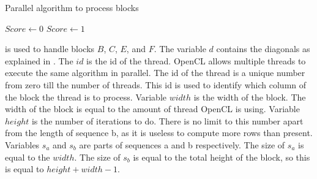 \begin{algorithm}[htb]
\caption{Parallel algorithm to process blocks} \label{block}
\begin{algorithmic}[1]
    \Statex
    \Statex
        \Statex
            \State $Score \gets 0$
        \Else
            \State $Score \gets 1$
        \EndIf
        \Statex
        \Statex
    \EndFor
\EndProcedure
\end{algorithmic}
\end{algorithm}


 is used to handle blocks $B$, $C$, $E$, and $F$.
The variable $d$ contains the diagonals as explained in .
The $id$ is the id of the thread.
OpenCL allows multiple threads to execute the same algorithm in parallel.
The id of the thread is a unique number from zero till the number of threads.
This id is used to identify which column of the block the thread is to process.
Variable $width$ is the width of the block.
The width of the block is equal to the amount of thread OpenCL is using.
Variable $height$ is the number of iterations to do.
There is no limit to this number apart from the length of sequence b, as it is useless to compute more rows than present.
Variables $s_a$ and $s_b$ are parts of sequences a and b respectively.
The size of $s_a$ is equal to the $width$.
The size of $s_b$ is equal to the total height of the block, so this is equal to $height + width - 1$.

